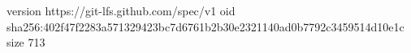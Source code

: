 version https://git-lfs.github.com/spec/v1
oid sha256:402f47f2283a571329423bc7d6761b2b30e2321140ad0b7792c3459514d10e1c
size 713
